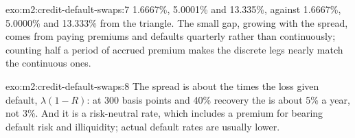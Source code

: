 \begin{solution}{exo:m2:credit-default-swaps:7}
1.6667\%, 5.0001\% and 13.335\%, against 1.6667\%, 5.0000\% and 13.333\% from the
triangle. The small gap, growing with the spread, comes from paying premiums and
defaults quarterly rather than continuously; counting half a period of accrued
premium makes the discrete legs nearly match the continuous ones.
\end{solution}

\begin{solution}{exo:m2:credit-default-swaps:8}
The spread is about the  times the loss given default, $\lambda(1-R)$: at
300 basis points and 40\% recovery the  is about 5\% a year, not 3\%. And it
is a risk-neutral rate, which includes a premium for bearing default risk and
illiquidity; actual default rates are usually lower.
\end{solution}

